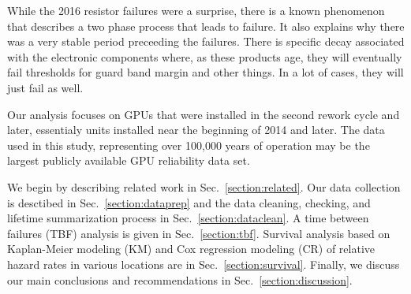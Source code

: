 While the 2016 resistor failures were a surprise, there is a known
phenomenon \cite{referenceneeded} that describes a two phase process
that leads to failure. It also explains why there was a very stable
period preceeding the failures. There is specific decay associated
with the electronic components where, as these products age, they will
eventually fail thresholds for guard band margin and other things. In
a lot of cases, they will just fail as well. 

Our analysis focuses on GPUs that were installed in the second rework
cycle and later, essentialy units installed near the beginning of 2014
and later.  The data used in this study, representing over 100,000
years of operation may be the largest publicly available GPU
reliability data set.

We begin by describing related work in Sec.~\ref{section:related}. Our
data collection is desctibed in Sec.~\ref{section:dataprep} and the
data cleaning, checking, and lifetime summarization process in
Sec.~\ref{section:dataclean}. A time between failures (TBF) analysis
is given in Sec.~\ref{section:tbf}. Survival analysis based on
Kaplan-Meier modeling (KM) and Cox regression modeling (CR) of
relative hazard rates in various locations are in
Sec.~\ref{section:survival}. Finally, we discuss our main conclusions
and recommendations in Sec.~\ref{section:discussion}.
 


